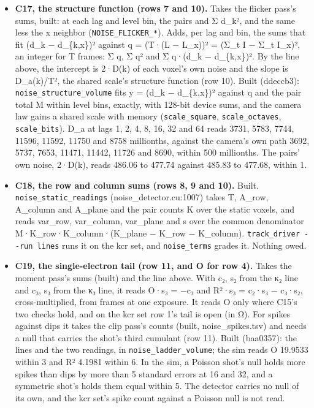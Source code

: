 \begin{enumerate}
\begin{itemize}
\item \textbf{C17, the structure function (rows 7 and 10).} Takes the flicker pass's sums, built: at each lag and level bin, the pairs and Σ d\_\allowbreak{}k², and the same less the x neighbor (\texttt{NOISE\_\allowbreak{}FLICKER\_\allowbreak{}*}). Adds, per lag and bin, the sums that fit (d\_\allowbreak{}k − d\_\allowbreak{}\{k,x\})² against q = (T·(L − L\_\allowbreak{}x))² = (Σ\_\allowbreak{}t I − Σ\_\allowbreak{}t I\_\allowbreak{}x)², an integer for T frames: Σ q, Σ q² and Σ q·(d\_\allowbreak{}k − d\_\allowbreak{}\{k,x\})². By the line above, the intercept is 2·D(k) of each voxel's own noise and the slope is D\_\allowbreak{}a(k)/T², the shared scale's structure function (row 10). Built (ddeccb3): \texttt{noise\_\allowbreak{}structure\_\allowbreak{}volume} fits y = (d\_\allowbreak{}k − d\_\allowbreak{}\{k,x\})² against q and the pair total M within level bins, exactly, with 128-bit device sums, and the camera law gains a shared scale with memory (\texttt{scale\_\allowbreak{}square}, \texttt{scale\_\allowbreak{}octaves}, \texttt{scale\_\allowbreak{}bits}). D\_\allowbreak{}a at lags 1, 2, 4, 8, 16, 32 and 64 reads 3731, 5783, 7744, 11596, 11592, 11750 and 8758 millionths, against the camera's own path 3692, 5737, 7653, 11471, 11442, 11726 and 8690, within 500 millionths. The pairs' own noise, 2·D(k), reads 486.06 to 477.74 against 485.83 to 477.68, within 1.
\item \textbf{C18, the row and column sums (rows 8, 9 and 10).} Built. \texttt{noise\_\allowbreak{}static\_\allowbreak{}readings} (noise\_\allowbreak{}detector.cu:1007) takes T, A\_\allowbreak{}row, A\_\allowbreak{}column and A\_\allowbreak{}plane and the pair counts K over the static voxels, and reads var\_\allowbreak{}row, var\_\allowbreak{}column, var\_\allowbreak{}plane and s over the common denominator M·K\_\allowbreak{}row·K\_\allowbreak{}column·(K\_\allowbreak{}plane − K\_\allowbreak{}row − K\_\allowbreak{}column). \texttt{track\_\allowbreak{}driver -\allowbreak{}-\allowbreak{}run lines} runs it on the kcr set, and \texttt{noise\_\allowbreak{}terms} grades it. Nothing owed.
\item \textbf{C19, the single-electron tail (row 11, and O for row 4).} Takes the moment pass's sums (built) and the line above. With c₂, s₂ from the κ₂ line and c₃, s₃ from the κ₃ line, it reads O·s₃ = −c₃ and R²·s₃ = c₂·s₃ − c₃·s₂, cross-multiplied, from frames at one exposure. It reads O only where C15's two checks hold, and on the kcr set row 1's tail is open (in Ω). For spikes against dips it takes the clip pass's counts (built, noise\_\allowbreak{}spikes.tsv) and needs a null that carries the shot's third cumulant (row 11). Built (baa0357): the lines and the two readings, in \texttt{noise\_\allowbreak{}ladder\_\allowbreak{}volume}; the sim reads O 19.9533 within 3 and R² 4.1981 within 6. In the sim, a Poisson shot's null holds more spikes than dips by more than 5 standard errors at 16 and 32, and a symmetric shot's holds them equal within 5. The detector carries no null of its own, and the kcr set's spike count against a Poisson null is not read.

\end{itemize}
\end{enumerate}
